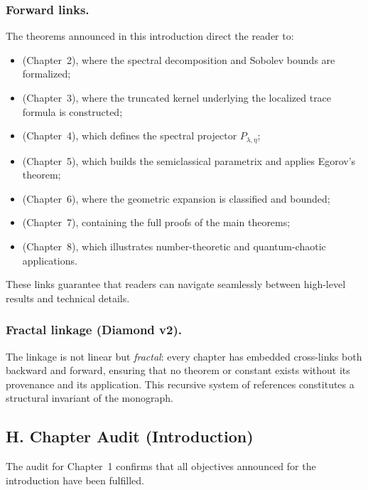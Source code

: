 \subsubsection*{Forward links.}
The theorems announced in this introduction direct the reader to:
\begin{itemize}
  \item {} (Chapter~2), where the spectral decomposition and Sobolev bounds are formalized;
  \item {} (Chapter~3), where the truncated kernel underlying the localized trace formula is constructed;
  \item {} (Chapter~4), which defines the spectral projector $P_{\lambda,\eta}$;
  \item {} (Chapter~5), which builds the semiclassical parametrix and applies Egorov’s theorem;
  \item {} (Chapter~6), where the geometric expansion is classified and bounded;
  \item {} (Chapter~7), containing the full proofs of the main theorems;
  \item {} (Chapter~8), which illustrates number-theoretic and quantum-chaotic applications.
\end{itemize}
These links guarantee that readers can navigate seamlessly between high-level results and technical details.

\subsubsection*{Fractal linkage (Diamond v2).}
The linkage is not linear but \emph{fractal}:
every chapter has embedded cross-links both backward and forward, ensuring that no theorem or constant
exists without its provenance and its application. This recursive system of references constitutes
a structural invariant of the monograph.

\subsection*{H. Chapter Audit (Introduction)}

The audit for Chapter~1 confirms that all objectives announced for the introduction have been fulfilled.

